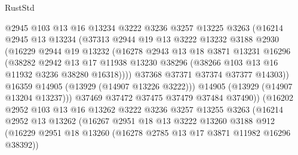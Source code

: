 \begin{lexlean}{RustStd}
\begin{coremodule}
                        @2945
                        @103
                        @13
                        @16
                        @13234
                        @3222
                        @3236
                        @3257
                        @13225
                        @3263
                        (@16214
                          @2945
                          @13
                          @13234
                          (@37313
                            @2944
                            @19
                            @13
                            @3222
                            @13232
                            @3188
                            @2930
                            (@16229
                              @2944
                              @19
                              @13232
                              (@16278
                                @2943
                                @13
                                @18
                                @3871
                                @13231
                                @16296
                                (@38282
                                  @2942
                                  @13
                                  @17
                                  @11938
                                  @13230
                                  @38296
                                  (@38266 @103 @13 @16 @11932 @3236 @38280 @16318))))
                            @37368
                            @37371
                            @37374
                            @37377
                            @14303))
                        @16359
                        @14905
                        (@13929 (@14907 @13226 @3222)))
                      @14905
                      (@13929 (@14907 @13204 @13237)))
                    @37469
                    @37472
                    @37475
                    @37479
                    @37484
                    @37490))
                (@16202
                  @2952
                  @103
                  @13
                  @16
                  @13262
                  @3222
                  @3236
                  @3257
                  @13255
                  @3263
                  (@16214
                    @2952
                    @13
                    @13262
                    (@16267
                      @2951
                      @18
                      @13
                      @3222
                      @13260
                      @3188
                      @912
                      (@16229 @2951 @18 @13260 (@16278 @2785 @13 @17 @3871 @11982 @16296 @38392))

\end{coremodule}
\end{lexlean}
